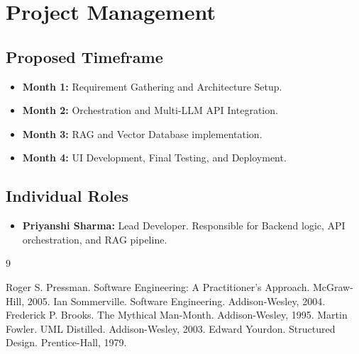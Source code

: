 \documentclass[12pt, a4paper]{report}
\begin{document}
\chapter{Project Management}

\section{Proposed Timeframe}
\begin{itemize}
    \item \textbf{Month 1:} Requirement Gathering and Architecture Setup.
    \item \textbf{Month 2:} Orchestration and Multi-LLM API Integration.
    \item \textbf{Month 3:} RAG and Vector Database implementation.
    \item \textbf{Month 4:} UI Development, Final Testing, and Deployment.
\end{itemize}

\section{Individual Roles}
\begin{itemize}
    \item \textbf{Priyanshi Sharma:} Lead Developer. Responsible for Backend logic, API orchestration, and RAG pipeline.
\end{itemize}

\begin{thebibliography}{9}
     Roger S. Pressman. Software Engineering: A Practitioner's Approach. McGraw-Hill, 2005.
     Ian Sommerville. Software Engineering. Addison-Wesley, 2004.
     Frederick P. Brooks. The Mythical Man-Month. Addison-Wesley, 1995.
     Martin Fowler. UML Distilled. Addison-Wesley, 2003.
     Edward Yourdon. Structured Design. Prentice-Hall, 1979.
\end{thebibliography}
\end{document}

